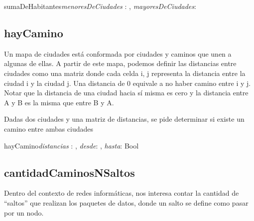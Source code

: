 \documentclass[10pt,a4paper]{article}
\begin{document}
\vspace{2mm}

\begin{proc}{sumaDeHabitantes}{\In \textit{menoresDeCiudades} : , \In \textit{mayoresDeCiudades}: }{}
\end{proc}

\vspace{4mm}

\subsection{hayCamino}

 Un mapa de ciudades está conformada por ciudades y caminos que unen a algunas de ellas. A partir de este mapa, podemos definir las distancias entre ciudades como una matriz donde cada celda i, j representa la distancia entre la ciudad i y la ciudad j. Una distancia de 0 equivale a no haber camino entre i y j. Notar que la distancia de una ciudad hacia sí misma es cero y la distancia entre A y B es la misma que entre B y A.
 
 Dadas dos ciudades y una matriz de distancias, se pide determinar si existe un camino entre ambas ciudades
 
 \vspace{2mm}
 
 \begin{proc}{hayCamino}{\In \textit{distancias} : \TLista{\TLista{\ent}}, \In \textit{desde}: \ent, \In \textit{hasta}: \ent}{Bool}
	\requiere{}
	\asegura{} 
\end{proc}

\vspace{4mm}

\subsection{cantidadCaminosNSaltos}

 Dentro del contexto de redes informáticas, nos interesa contar la cantidad de “saltos” que realizan los paquetes de datos, donde un salto se define como pasar por un nodo.
\end{document}
